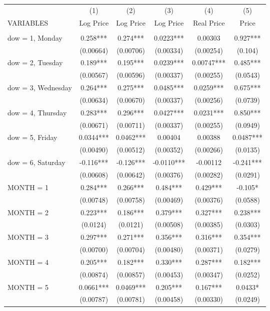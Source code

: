 \begin{tabular}{lccccc} \hline
 & (1) & (2) & (3) & (4) & (5) \\
VARIABLES & Log Price & Log Price & Log Price & Real Price & Price \\ \hline
 &  &  &  &  &  \\
dow = 1, Monday & 0.258*** & 0.274*** & 0.0223*** & 0.00303 & 0.927*** \\
 & (0.00664) & (0.00706) & (0.00334) & (0.00254) & (0.104) \\
dow = 2, Tuesday & 0.189*** & 0.195*** & 0.0239*** & 0.00747*** & 0.485*** \\
 & (0.00567) & (0.00596) & (0.00337) & (0.00255) & (0.0543) \\
dow = 3, Wednesday & 0.264*** & 0.275*** & 0.0485*** & 0.0259*** & 0.675*** \\
 & (0.00634) & (0.00670) & (0.00337) & (0.00256) & (0.0739) \\
dow = 4, Thursday & 0.283*** & 0.296*** & 0.0427*** & 0.0231*** & 0.850*** \\
 & (0.00671) & (0.00711) & (0.00337) & (0.00255) & (0.0949) \\
dow = 5, Friday & 0.0344*** & 0.0462*** & 0.00404 & 0.00388 & 0.0487*** \\
 & (0.00490) & (0.00512) & (0.00352) & (0.00266) & (0.0135) \\
dow = 6, Saturday & -0.116*** & -0.126*** & -0.0110*** & -0.00112 & -0.241*** \\
 & (0.00608) & (0.00642) & (0.00376) & (0.00282) & (0.0291) \\
MONTH = 1 & 0.284*** & 0.266*** & 0.484*** & 0.429*** & -0.105* \\
 & (0.00748) & (0.00758) & (0.00469) & (0.00376) & (0.0588) \\
MONTH = 2 & 0.223*** & 0.186*** & 0.379*** & 0.327*** & 0.238*** \\
 & (0.0124) & (0.0121) & (0.00508) & (0.00385) & (0.0303) \\
MONTH = 3 & 0.297*** & 0.271*** & 0.356*** & 0.316*** & 0.354*** \\
 & (0.00700) & (0.00704) & (0.00480) & (0.00371) & (0.0279) \\
MONTH = 4 & 0.205*** & 0.182*** & 0.330*** & 0.287*** & 0.182*** \\
 & (0.00874) & (0.00857) & (0.00453) & (0.00347) & (0.0252) \\
MONTH = 5 & 0.0661*** & 0.0469*** & 0.205*** & 0.167*** & 0.0433* \\
 & (0.00787) & (0.00781) & (0.00458) & (0.00330) & (0.0249) \\

\end{tabular}

